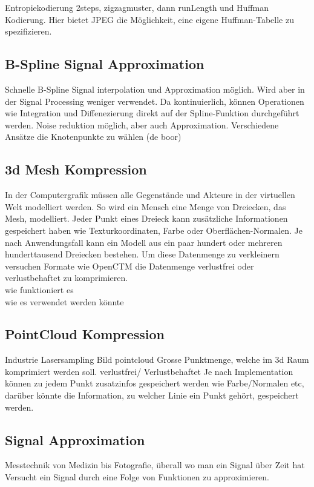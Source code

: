 Entropiekodierung 2steps, zigzagmuster, dann runLength und Huffman Kodierung. Hier bietet JPEG die Möglichkeit, eine eigene Huffman-Tabelle zu spezifizieren.

\subsection{B-Spline Signal Approximation}
\cite{unser1993b:spline} Schnelle B-Spline Signal interpolation und Approximation möglich. Wird aber in der Signal Processing weniger verwendet. Da kontinuierlich, können Operationen wie Integration und Diffenezierung direkt auf der Spline-Funktion durchgeführt werden. Noise reduktion möglich, aber auch Approximation. Verschiedene Ansätze die Knotenpunkte zu wählen (de boor)

\subsection{3d Mesh Kompression}
In der Computergrafik müssen alle Gegenstände und Akteure in der virtuellen Welt modelliert werden. So wird ein Mensch eine Menge von Dreiecken, das Mesh, modelliert. Jeder Punkt eines Dreieck kann zusätzliche Informationen gespeichert haben wie Texturkoordinaten, Farbe oder Oberflächen-Normalen. Je nach Anwendungsfall kann ein Modell aus ein paar hundert oder mehreren hunderttausend Dreiecken bestehen. Um diese Datenmenge zu verkleinern versuchen Formate wie OpenCTM \cite{website:openctm} die Datenmenge verlustfrei oder verlustbehaftet zu komprimieren.\\
wie funktioniert es\\

wie es verwendet werden könnte

\subsection{PointCloud Kompression}
Industrie Lasersampling
Bild pointcloud
Grosse Punktmenge, welche im 3d Raum komprimiert werden soll.
verlustfrei/ Verlustbehaftet
Je nach Implementation können zu jedem Punkt zusatzinfos gespeichert werden wie Farbe/Normalen etc, darüber könnte die Information, zu welcher Linie ein Punkt gehört, gespeichert werden.

\subsection{Signal Approximation}
Messtechnik von Medizin bis Fotografie, überall wo man ein Signal über Zeit hat
Versucht ein Signal durch eine Folge von Funktionen zu approximieren.

